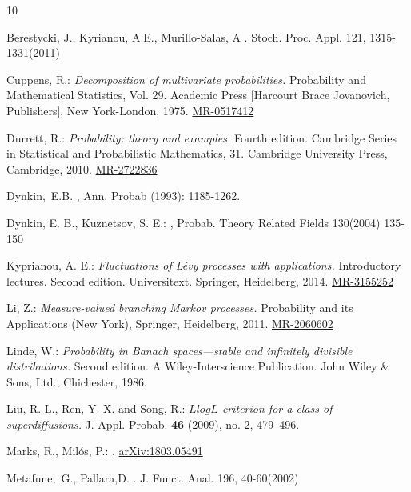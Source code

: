 \documentclass[12pt,a4paper]{amsart}
\def\MR#1{\href{http://www.ams.org/mathscinet-getitem?mr=#1}{MR-#1}}
\def\ARXIV#1{\href{https://arxiv.org/abs/#1}{arXiv:#1}}
\theoremstyle{plain}
\theoremstyle{definition}
\numberwithin{equation}{section}
\begin{document}
\begin{thebibliography} {10}

Berestycki, J., Kyrianou, A.E., Murillo-Salas, A
. Stoch. Proc. Appl. 121, 1315-1331(2011)

Cuppens, R.:
\emph{Decomposition of multivariate probabilities.}
Probability and Mathematical Statistics, Vol. 29. Academic Press [Harcourt Brace Jovanovich, Publishers], New York-London, 1975.
\MR{0517412}

Durrett, R.:
\emph{Probability: theory and examples.}
Fourth edition. Cambridge Series in Statistical and Probabilistic Mathematics, 31. Cambridge University Press, Cambridge, 2010.
\MR{2722836}

Dynkin,~E.B.
, Ann. Probab (1993): 1185-1262.

Dynkin, E. B., Kuznetsov, S. E.:
, Probab. Theory Related Fields 130(2004) 135-150

Kyprianou, A. E.:
\emph{Fluctuations of L\'{e}vy processes with applications.}
Introductory lectures. Second edition. Universitext. Springer, Heidelberg, 2014.
\MR{3155252}

Li, Z.:
\emph{Measure-valued branching Markov processes.}
Probability and its Applications (New York), Springer, Heidelberg, 2011.
\MR{2060602}

Linde, W.:
\emph{Probability in Banach spaces—stable and infinitely divisible distributions.}
Second edition. A Wiley-Interscience Publication. John Wiley \& Sons, Ltd., Chichester, 1986.

Liu, R.-L., Ren, Y.-X. and Song, R.:
\emph{{$LlogL$} criterion for a class of superdiffusions.}  
J. Appl. Probab. \textbf{46} (2009), no. 2, 479–496. 

Marks, R., Mil\'{o}s, P.:
.
\ARXIV{1803.05491}

Metafune,~G., Pallara,D.
. J. Funct. Anal. 196, 40-60(2002)


\end{thebibliography}
\end{document}
